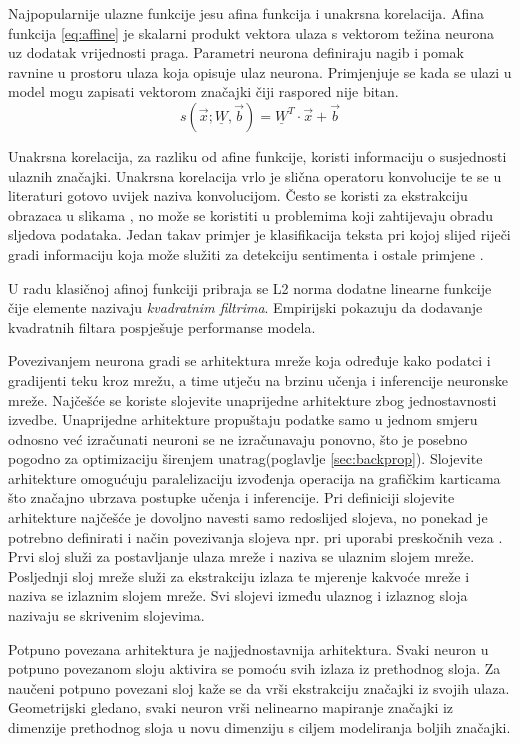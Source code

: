 \documentclass[times, utf8, numeric, diplomski]{fer}
\def\mat#1{\underline{#1}}
\def\secref#1{(poglavlje \ref{#1})}
\begin{document}
Najpopularnije ulazne funkcije jesu afina funkcija i unakrsna korelacija.
Afina funkcija \eqref{eq:affine} je skalarni produkt vektora ulaza s vektorom težina neurona uz dodatak vrijednosti praga. Parametri neurona definiraju nagib i pomak ravnine u prostoru ulaza koja opisuje ulaz neurona. Primjenjuje se kada se ulazi u model mogu zapisati vektorom značajki čiji raspored nije bitan.
\begin{equation}
\label{eq:affine}
s(\vec{x};\mat{W},\vec{b})=\mat{W}^T \cdot \vec{x} + \vec{b}
\end{equation}

Unakrsna korelacija, za razliku od afine funkcije, koristi informaciju o susjednosti ulaznih značajki. Unakrsna korelacija vrlo je slična operatoru konvolucije te se u literaturi gotovo uvijek naziva konvolucijom. Često se koristi za ekstrakciju obrazaca u slikama \citep{alexnet}, no može se koristiti u problemima koji zahtijevaju obradu sljedova podataka. Jedan takav primjer je klasifikacija teksta pri kojoj slijed riječi gradi informaciju koja može služiti za detekciju sentimenta i ostale primjene \citep{char_cnn}.

U radu \citet{softsign} klasičnoj afinoj funkciji pribraja se L2 norma dodatne linearne funkcije čije elemente nazivaju \textit{kvadratnim filtrima}. Empirijski pokazuju da dodavanje kvadratnih filtara pospješuje performanse modela.

Povezivanjem neurona gradi se arhitektura mreže koja određuje kako podatci i gradijenti teku kroz mrežu, a time utječu na brzinu učenja i inferencije neuronske mreže. Najčešće se koriste slojevite unaprijedne arhitekture zbog jednostavnosti izvedbe. Unaprijedne arhitekture propuštaju podatke samo u jednom smjeru odnosno već izračunati neuroni se ne izračunavaju ponovno, što je posebno pogodno za optimizaciju širenjem unatrag\secref{sec:backprop}. Slojevite arhitekture omogućuju paralelizaciju izvođenja operacija na grafičkim karticama što značajno ubrzava postupke učenja i inferencije. Pri definiciji slojevite arhitekture najčešće je dovoljno navesti samo redoslijed slojeva, no ponekad je potrebno definirati i način povezivanja slojeva npr. pri uporabi preskočnih veza \citep{highwaynet, resnet, densenet}. Prvi sloj služi za postavljanje ulaza mreže i naziva se ulaznim slojem mreže. Posljednji sloj mreže služi za ekstrakciju izlaza te mjerenje kakvoće mreže i naziva se izlaznim slojem mreže. Svi slojevi između ulaznog i izlaznog sloja nazivaju se skrivenim slojevima.

Potpuno povezana arhitektura je najjednostavnija arhitektura. Svaki neuron u potpuno povezanom sloju aktivira se pomoću svih izlaza iz prethodnog sloja. Za naučeni potpuno povezani sloj kaže se da vrši ekstrakciju značajki iz svojih ulaza. Geometrijski gledano, svaki neuron vrši nelinearno mapiranje značajki iz dimenzije prethodnog sloja u novu dimenziju s ciljem modeliranja boljih značajki.
\end{document}
